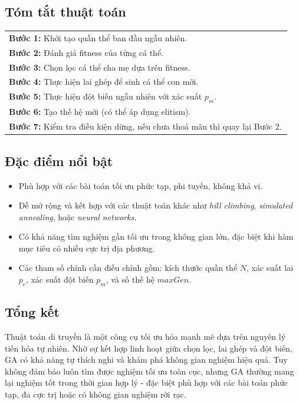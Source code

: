 \documentclass[a4paper]{report}
\begin{document}
\subsection{Tóm tắt thuật toán}
\begin{center}
\begin{tabular}{p{0.95\linewidth}}
\textbf{Bước 1:} Khởi tạo quần thể ban đầu ngẫu nhiên. \\[0.4em]
\textbf{Bước 2:} Đánh giá fitness của từng cá thể. \\[0.4em]
\textbf{Bước 3:} Chọn lọc cá thể cha mẹ dựa trên fitness. \\[0.4em]
\textbf{Bước 4:} Thực hiện lai ghép để sinh cá thể con mới. \\[0.4em]
\textbf{Bước 5:} Thực hiện đột biến ngẫu nhiên với xác suất $p_m$. \\[0.4em]
\textbf{Bước 6:} Tạo thế hệ mới (có thể áp dụng elitism). \\[0.4em]
\textbf{Bước 7:} Kiểm tra điều kiện dừng, nếu chưa thoả mãn thì quay lại Bước 2. \\
\end{tabular}
\end{center}

\subsection{Đặc điểm nổi bật}
\begin{itemize}
    \item Phù hợp với các bài toán tối ưu phức tạp, phi tuyến, không khả vi.
    \item Dễ mở rộng và kết hợp với các thuật toán khác như \textit{hill climbing}, \textit{simulated annealing}, hoặc \textit{neural networks}.
    \item Có khả năng tìm nghiệm gần tối ưu trong không gian lớn, đặc biệt khi hàm mục tiêu có nhiều cực trị địa phương.
    \item Các tham số chính cần điều chỉnh gồm: kích thước quần thể $N$, xác suất lai $p_c$, xác suất đột biến $p_m$, và số thế hệ $maxGen$.
\end{itemize}

\subsection{Tổng kết}
Thuật toán di truyền là một công cụ tối ưu hóa mạnh mẽ dựa trên nguyên lý tiến hóa tự nhiên.  
Nhờ sự kết hợp linh hoạt giữa chọn lọc, lai ghép và đột biến, GA có khả năng tự thích nghi và khám phá không gian nghiệm hiệu quả.  
Tuy không đảm bảo luôn tìm được nghiệm tối ưu toàn cục, nhưng GA thường mang lại nghiệm tốt trong thời gian hợp lý - đặc biệt phù hợp với các bài toán phức tạp, đa cực trị hoặc có không gian nghiệm rời rạc.
\end{document}

